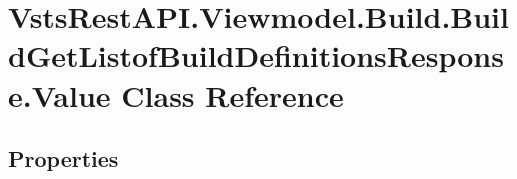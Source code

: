 \hypertarget{class_vsts_rest_a_p_i_1_1_viewmodel_1_1_build_1_1_build_get_listof_build_definitions_response_1_1_value}{}\section{Vsts\+Rest\+A\+P\+I.\+Viewmodel.\+Build.\+Build\+Get\+Listof\+Build\+Definitions\+Response.\+Value Class Reference}
\label{class_vsts_rest_a_p_i_1_1_viewmodel_1_1_build_1_1_build_get_listof_build_definitions_response_1_1_value}
\subsection*{Properties}
